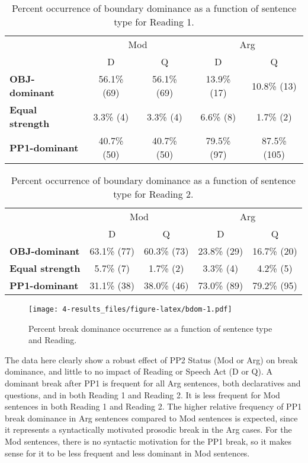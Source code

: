 \documentclass[11pt,oneside]{book}
\begin{document}
\begin{table}[!h]

\caption{\label{tab:r1dombreaks}Percent occurrence of boundary dominance as a function of sentence type for Reading 1.}
\centering
\begin{tabular}{>{\bfseries}lcccc}
\toprule
\multicolumn{1}{c}{ } & \multicolumn{2}{c}{Mod} & \multicolumn{2}{c}{Arg} \\
\cmidrule(l{3pt}r{3pt}){2-3} \cmidrule(l{3pt}r{3pt}){4-5}
  & D & Q & D & Q\\
\midrule
OBJ-dominant & 56.1\% (69) & 56.1\% (69) & 13.9\% (17) & 10.8\% (13)\\
Equal strength & 3.3\% (4) & 3.3\% (4) & 6.6\% (8) & 1.7\% (2)\\
PP1-dominant & 40.7\% (50) & 40.7\% (50) & 79.5\% (97) & 87.5\% (105)\\
\bottomrule
\end{tabular}
\end{table}
\begin{table}[!h]

\caption{\label{tab:r2dombreaks}Percent occurrence of boundary dominance as a function of sentence type for Reading 2.}
\centering
\begin{tabular}{>{\bfseries}lcccc}
\toprule
\multicolumn{1}{c}{ } & \multicolumn{2}{c}{Mod} & \multicolumn{2}{c}{Arg} \\
\cmidrule(l{3pt}r{3pt}){2-3} \cmidrule(l{3pt}r{3pt}){4-5}
  & D & Q & D & Q\\
\midrule
OBJ-dominant & 63.1\% (77) & 60.3\% (73) & 23.8\% (29) & 16.7\% (20)\\
Equal strength & 5.7\% (7) & 1.7\% (2) & 3.3\% (4) & 4.2\% (5)\\
PP1-dominant & 31.1\% (38) & 38.0\% (46) & 73.0\% (89) & 79.2\% (95)\\
\bottomrule
\end{tabular}
\end{table}

\begin{figure}
\centering
\texttt{[image: 4-results\_files/figure-latex/bdom-1.pdf]}
\caption{\label{fig:bdom}Percent break dominance occurrence as a function of sentence type and Reading.}
\end{figure}

The data here clearly show a robust effect of PP2 Status (Mod or Arg) on break dominance, and little to no impact of Reading or Speech Act (D or Q). A dominant break after PP1 is frequent for all Arg sentences, both declaratives and questions, and in both Reading 1 and Reading 2. It is less frequent for Mod sentences in both Reading 1 and Reading 2. The higher relative frequency of PP1 break dominance in Arg sentences compared to Mod sentences is expected, since it represents a syntactically motivated prosodic break in the Arg cases. For the Mod sentences, there is no syntactic motivation for the PP1 break, so it makes sense for it to be less frequent and less dominant in Mod sentences.
\end{document}
